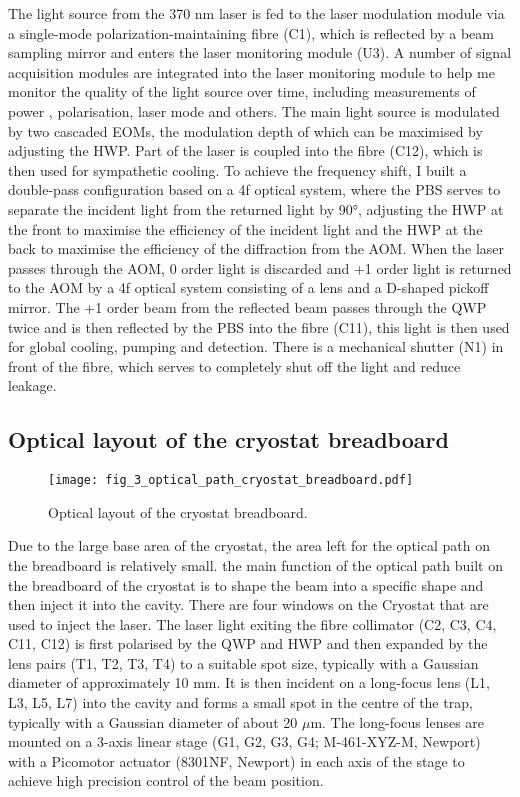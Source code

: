 The light source from the 370 nm laser is fed to the laser modulation module via a single-mode polarization-maintaining fibre (C1), which is reflected by a beam sampling mirror and enters the laser monitoring module (U3). A number of signal acquisition modules are integrated into the laser monitoring module to help me monitor the quality of the light source over time, including measurements of power , polarisation, laser mode and others. The main light source is modulated by two cascaded EOMs, the modulation depth of which can be maximised by adjusting the HWP. Part of the laser is coupled into the fibre (C12), which is then used for sympathetic cooling. To achieve the frequency shift, I built a double-pass configuration based on a 4f optical system, where the PBS serves to separate the incident light from the returned light by 90°, adjusting the HWP at the front to maximise the efficiency of the incident light and the HWP at the back to maximise the efficiency of the diffraction from the AOM. When the laser passes through the AOM, 0 order light is discarded and +1 order light is returned to the AOM by a 4f optical system consisting of a lens and a D-shaped pickoff mirror. The +1 order beam from the reflected beam passes through the QWP twice and is then reflected by the PBS into the fibre (C11), this light is then used for global cooling, pumping and detection. There is a mechanical shutter (N1) in front of the fibre, which serves to completely shut off the light and reduce leakage.

\subsection{Optical layout of the cryostat breadboard}

\begin{figure}
    \centering
    \texttt{[image: fig\_3\_optical\_path\_cryostat\_breadboard.pdf]}
    \caption{Optical layout of the cryostat breadboard.}
    \label{fig:fig_3_optical_path_cryostat_breadboard}
\end{figure}

Due to the large base area of the cryostat, the area left for the optical path on the breadboard is relatively small. the main function of the optical path built on the breadboard of the cryostat is to shape the beam into a specific shape and then inject it into the cavity. There are four windows on the Cryostat that are used to inject the laser. The laser light exiting the fibre collimator (C2, C3, C4, C11, C12) is first polarised by the QWP and HWP and then expanded by the lens pairs (T1, T2, T3, T4) to a suitable spot size, typically with a Gaussian diameter of approximately 10 mm. It is then incident on a long-focus lens (L1, L3, L5, L7) into the cavity and forms a small spot in the centre of the trap, typically with a Gaussian diameter of about 20 $\mu$m. The long-focus lenses are mounted on a 3-axis linear stage (G1, G2, G3, G4; M-461-XYZ-M, Newport) with a Picomotor actuator (8301NF, Newport) in each axis of the stage to achieve high precision control of the beam position.

